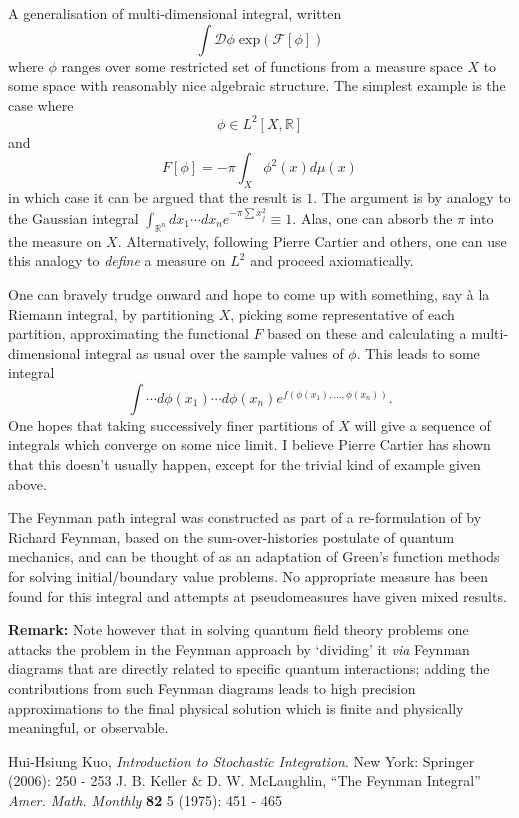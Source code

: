 \documentclass[12pt]{article}
\newcommand{\RR}{\mathbb{R}}
\newcommand{\dotsint}{ \int \cdots}
\begin{document}

A generalisation of multi-dimensional integral, written
\[
  \int \mathcal{D}\phi \;\mathrm{exp} \left (\mathcal{F} [\phi] \right )
\]
where $\phi$ ranges over some restricted set of functions from a measure space $X$ to some space with reasonably nice algebraic structure. The simplest example is the case where 
\[
  \phi \in L^2[X,\RR]
\]
and 
\[
  F[\phi] = -\pi \int_X \phi^2(x) d\mu(x)
\]
in which case it can be argued that the result is $1$. The argument is by analogy to the Gaussian integral
$\int_{\RR^n} dx_1\cdots dx_n e^{-\pi\sum x_j^2} \equiv 1$. Alas, one can absorb the $\pi$ into the measure on $X$.
Alternatively, following Pierre Cartier and others, one can use this analogy to {\em define} a measure on $L^2$
and proceed axiomatically.

One can bravely trudge onward and hope to come up with something, say \`a la Riemann integral, by partitioning $X$,
picking some representative of each partition, approximating the functional $F$ based on these
and calculating a  multi-dimensional integral as usual over the sample values of $\phi$. This leads to some integral
\[
  \dotsint d\phi(x_1) \cdots d\phi(x_n) e^{f(\phi(x_1),\ldots,\phi(x_n))}.
\]
One hopes that taking successively finer partitions of $X$ will give a sequence of integrals which converge on some nice limit. I believe Pierre Cartier has shown that this doesn't usually happen, except for the trivial kind of example given above.

The Feynman path integral was constructed as part of a re-formulation of  by Richard Feynman, based on the sum-over-histories postulate of quantum mechanics, and can be thought of as an adaptation of Green's function methods for solving initial/boundary value problems. No appropriate measure has been found for this integral and attempts at pseudomeasures have given mixed results.

{\bf Remark:}
Note however that in solving quantum field theory problems one attacks the problem in the Feynman approach by
`dividing' it \emph{via} Feynman diagrams that are directly related to specific quantum interactions;
adding the contributions from such Feynman diagrams leads to high precision approximations to the final physical 
solution which is finite and physically meaningful, or observable.

\begin{thebibliography}{2}
 Hui-Hsiung Kuo, {\it Introduction to Stochastic Integration}. New York: Springer (2006): 250 - 253
 J. B. Keller \& D. W. McLaughlin, ``The Feynman Integral'' {\it Amer. Math. Monthly} {\bf 82} 5 (1975): 451 - 465
\end{thebibliography}
\end{document}
